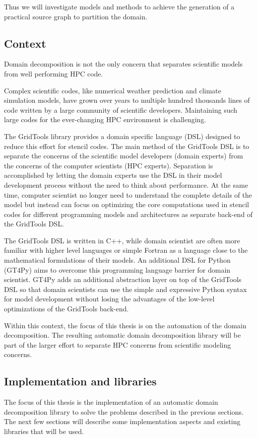 Thus we will investigate models and methods to achieve the generation of a practical source graph to partition the domain.

\subsection{Context}
Domain decomposition is not the only concern that separates scientific models from well performing HPC code.

Complex scientific codes, like numerical weather prediction and climate simulation models, have grown over years to multiple hundred thousands lines of code written by a large community of scientific developers.
Maintaining such large codes for the ever-changing HPC environment is challenging.

The GridTools library provides a domain specific language (DSL) designed to reduce this effort for stencil codes.
The main method of the GridTools DSL is to separate the concerns of the scientific model developers (domain experts) from the concerns of the computer scientists (HPC experts).
Separation is accomplished by letting the domain experts use the DSL in their model development process without the need to think about performance.
At the same time, computer scientist no longer need to understand the complete details of the model but instead can focus on optimizing the core computations used in stencil codes for different programming models and architectures as separate back-end of the GridTools DSL.

The GridTools DSL is written in C++, while domain scientist are often more familiar with higher level languages or simple Fortran as a language close to the mathematical formulations of their models.
An additional DSL for Python (GT4Py) aims to overcome this programming language barrier for domain scientist.
GT4Py adds an additional abstraction layer on top of the GridTools DSL so that domain scientists can use the simple and expressive Python syntax for model development without losing the advantages of the low-level optimizations of the GridTools back-end.

Within this context, the focus of this thesis is on the automation of the domain decomposition.
The resulting automatic domain decomposition library will be part of the larger effort to separate HPC concerns from scientific modeling concerns.

\subsection{Implementation and libraries}
The focus of this thesis is the implementation of an automatic domain decomposition library to solve the problems described in the previous sections.
The next few sections will describe some implementation aspects and existing libraries that will be used.

